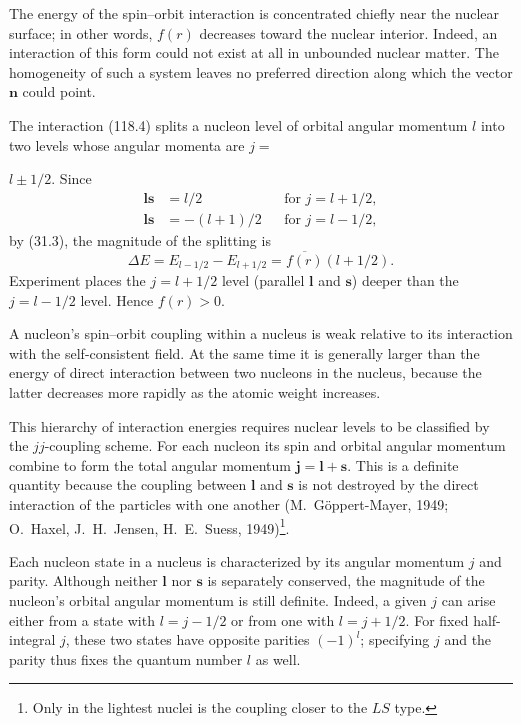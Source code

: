 The energy of the spin--orbit interaction is concentrated chiefly near the
nuclear surface; in other words, $f(r)$ decreases toward the nuclear interior.
Indeed, an interaction of this form could not exist at all in unbounded nuclear
matter. The homogeneity of such a system leaves no preferred direction along
which the vector $\mathbf n$ could point.

The interaction (118.4) splits a nucleon level of orbital angular momentum
$l$ into two levels whose angular momenta are $j=$

$l\pm1/2$. Since
\begin{equation}
 \begin{aligned}
  \mathbf l\mathbf s&=l/2 &&\text{for }j=l+1/2,\\
  \mathbf l\mathbf s&=-(l+1)/2 &&\text{for }j=l-1/2,
 \end{aligned}
 \tag{118.5}
\end{equation}
by (31.3), the magnitude of the splitting is
\begin{equation}
 \Delta E=E_{l-1/2}-E_{l+1/2}=\overline{f(r)}(l+1/2).
 \tag{118.6}
\end{equation}
Experiment places the $j=l+1/2$ level (parallel $\mathbf l$ and $\mathbf s$)
deeper than the $j=l-1/2$ level. Hence $f(r)>0$.

A nucleon's spin--orbit coupling within a nucleus is weak relative to its
interaction with the self-consistent field. At the same time it is generally
larger than the energy of direct interaction between two nucleons in the
nucleus, because the latter decreases more rapidly as the atomic weight
increases.

This hierarchy of interaction energies requires nuclear levels to be
classified by the $jj$-coupling scheme. For each nucleon its spin and orbital
angular momentum combine to form the total angular momentum
$\mathbf j=\mathbf l+\mathbf s$. This is a definite quantity because the
coupling between $\mathbf l$ and $\mathbf s$ is not destroyed by the direct
interaction of the particles with one another (M.~G\"oppert-Mayer, 1949;
O.~Haxel, J.~H.~Jensen, H.~E.~Suess, 1949)\footnote{Only in the lightest
nuclei is the coupling closer to the $LS$ type.}.


Each nucleon state in a nucleus is characterized by its angular momentum $j$
and parity. Although neither $\mathbf l$ nor $\mathbf s$ is separately
conserved, the magnitude of the nucleon's orbital angular momentum is still
definite. Indeed, a given $j$ can arise either from a state with $l=j-1/2$ or
from one with $l=j+1/2$. For fixed half-integral $j$, these two states have
opposite parities $(-1)^l$; specifying $j$ and the parity thus fixes the
quantum number $l$ as well.

